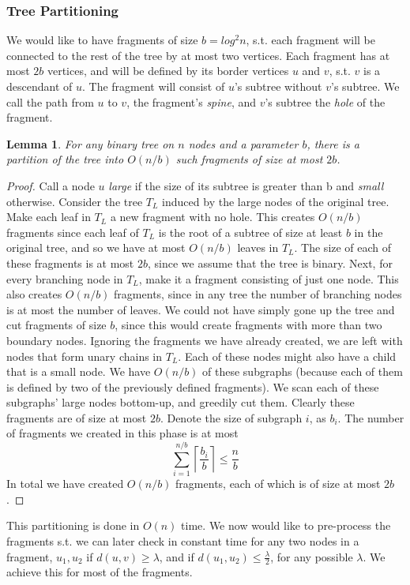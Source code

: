 \documentclass[11pt,a4paper]{article}
\newtheorem{lemma}{Lemma}
\theoremstyle{definition}
\theoremstyle{remark}
\begin{document}
\subsubsection{Tree Partitioning}\label{tree partitioning}
We would like to have fragments of size $b=log^2n$, s.t. each fragment will be connected to the rest of the tree by at most two vertices. Each fragment has at most $2b$ vertices, and will be defined by its border vertices $u$ and $v$, s.t. $v$ is a descendant of $u$. The fragment will consist of $u$'s subtree without $v$'s subtree. We call the path from $u$ to $v$, the fragment's \textit{spine}, and $v$'s subtree the \textit{hole} of the fragment. %
\begin{lemma}\label{basic partitioning lemma}
For any binary tree on $n$ nodes and a parameter $b$, there is a partition of the tree into $O(n/b)$ such fragments of size at most $2b$.
\end{lemma}
\begin{proof}
Call a node $u$ \textit{large} if the size of its subtree is greater than b and \textit{small}
otherwise. Consider the tree $T_L$ induced by the large nodes of the original tree. Make each leaf in $T_L$ a new fragment with no hole. This creates $O(n/b)$ fragments since each leaf of $T_L$ is the root of a subtree of size at least $b$ in the original tree, and so we have at most $O(n/b)$ leaves in $T_L$. The size of each of these fragments is at most $2b$, since we assume that the tree is binary.
Next, for every branching node in $T_L$, make it a fragment consisting of just one node. This also creates $O(n/b)$ fragments, since in any tree the number of branching nodes is at most the number of leaves. We could not have simply gone up the tree and cut fragments of size $b$, since this would create fragments with more than two boundary nodes.
Ignoring the fragments we have already created, we are left with nodes that form unary chains in $T_L$. Each of these nodes might also have a child that is a small node. We have $O(n/b)$ of these subgraphs (because each of them is defined by two of the previously defined fragments). We scan each of these subgraphs' large nodes bottom-up, and greedily cut them. Clearly these fragments are of size at most $2b$. Denote the size of subgraph $i$, as $b_i$. The number of fragments we created in this phase is at most $$\sum_{i=1}^{n/b} \left\lceil \frac{b_i}{b} \right\rceil \leq \frac{n}{b}$$
In total we have created $O(n/b)$ fragments, each of which is of size at most $2b$.
\end{proof}
This partitioning is done in $O(n)$ time.
We now would like to pre-process the fragments s.t. we can later check in constant time for any two nodes in a fragment, $u_1,u_2$ if $d(u,v)\geq\lambda$, and if $d(u_1,u_2) \leq \frac{\lambda}{2}$, for any possible $\lambda$. We achieve this for most of the fragments.
\end{document}
